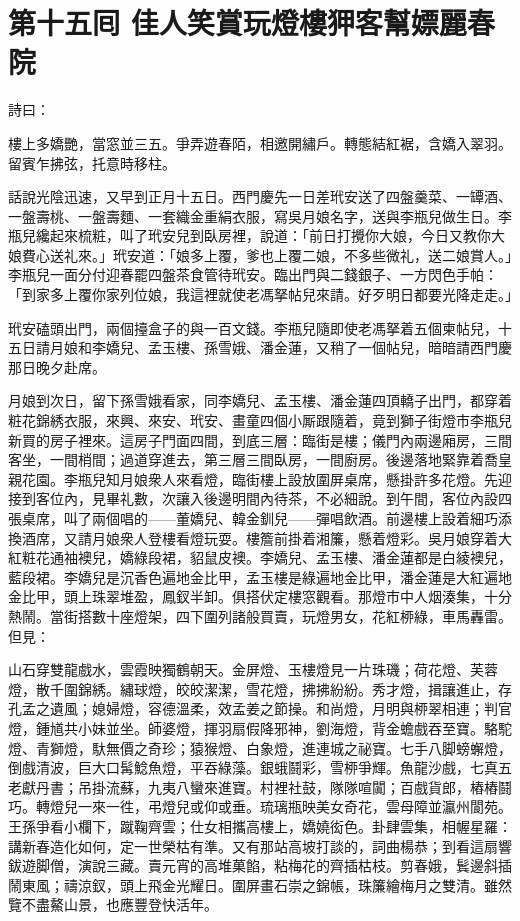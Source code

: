 
\chapter*{第十五囘 佳人笑賞玩燈樓狎客幫嫖麗春院}


詩曰：

樓上多嬌艷，當窓並三五。爭弄遊春陌，相邀開繡戶。轉態結紅裾，含嬌入翠羽。留賓乍拂弦，托意時移柱。

話說光陰迅速，又早到正月十五日。西門慶先一日差玳安送了四盤羹菜、一罈酒、一盤壽桃、一盤壽麵、一套織金重絹衣服，寫吳月娘名字，送與李瓶兒做生日。李瓶兒纔起來梳粧，叫了玳安兒到臥房裡，說道：「前日打攪你大娘，今日又教你大娘費心送礼來。」玳安道：「娘多上覆，爹也上覆二娘，{}不多些微礼，送二娘賞人。」李瓶兒一面分付迎春罷四盤茶食管待玳安。臨出門與二錢銀子、一方閃色手帕：「到家多上覆你家列位娘，我這裡就使老馮拏帖兒來請。好歹明日都要光降走走。」

玳安磕頭出門，兩個擡盒子的與一百文錢。李瓶兒隨即使老馮拏着五個柬帖兒，十五日請月娘和李嬌兒、孟玉樓、孫雪娥、潘金蓮，又稍了一個帖兒，暗暗請西門慶那日晚夕赴席。

月娘到次日，留下孫雪娥看家，同李嬌兒、孟玉樓、潘金蓮四頂轎子出門，都穿着粧花錦綉衣服，來興、來安、玳安、畫童四個小厮跟隨着，竟到獅子街燈市李瓶兒新買的房子裡來。這房子門面四間，到底三層：臨街是樓；儀門內兩邊廂房，三間客坐，一間梢間；過道穿進去，第三層三間臥房，一間廚房。後邊落地緊靠着喬皇親花園。{}李瓶兒知月娘衆人來看燈，臨街樓上設放圍屏桌席，懸掛許多花燈。先迎接到客位內，見畢礼數，次讓入後邊明間內待茶，不必細說。到午間，客位內設四張桌席，叫了兩個唱的——董嬌兒、韓金釧兒——彈唱飲酒。前邊樓上設着細巧添換酒席，又請月娘衆人登樓看燈玩耍。樓簷前掛着湘簾，懸着燈彩。吳月娘穿着大紅粧花通袖襖兒，嬌綠段裙，貂鼠皮襖。李嬌兒、孟玉樓、潘金蓮都是白綾襖兒，藍段裙。李嬌兒是沉香色遍地金比甲，孟玉樓是綠遍地金比甲，潘金蓮是大紅遍地金比甲，頭上珠翠堆盈，鳳釵半卸。俱搭伏定樓窓觀看。那燈市中人烟湊集，十分熱鬧。當街搭數十座燈架，四下圍列諸般買賣，玩燈男女，花紅桺綠，車馬轟雷。但見：

山石穿雙龍戲水，雲霞映獨鶴朝天。金屏燈、玉樓燈見一片珠璣；荷花燈、芙蓉燈，散千圍錦綉。繡球燈，皎皎潔潔，雪花燈，拂拂紛紛。秀才燈，揖讓進止，存孔孟之遺風；{}媳婦燈，容德溫柔，效孟姜之節操。和尚燈，月明與桺翠相連；判官燈，鍾馗共小妹並坐。師婆燈，揮羽扇假降邪神，劉海燈，背金蟾戲吞至寶。駱駝燈、青獅燈，馱無價之奇珍；猿猴燈、白象燈，進連城之祕寶。七手八脚螃蠏燈，倒戲清波，巨大口髯鯰魚燈，平吞綠藻。銀蛾鬪彩，雪桺爭輝。魚龍沙戲，七真五老獻丹書；吊掛流蘇，九夷八蠻來進寶。村裡社鼓，隊隊喧闐；百戲貨郎，樁樁鬪巧。轉燈兒一來一徃，弔燈兒或仰或垂。琉璃瓶映美女奇花，雲母障並瀛州閬苑。王孫爭看小欄下，蹴鞠齊雲；仕女相攜高樓上，嬌嬈衒色。卦肆雲集，相幄星羅：講新春造化如何，定一世榮枯有準。又有那站高坡打談的，詞曲楊恭；到看這扇響鈸遊脚僧，演說三藏。賣元宵的高堆菓餡，粘梅花的齊插枯枝。剪春娥，鬂邊斜插鬧東風；禱涼釵，頭上飛金光耀日。圍屏畫石崇之錦帳，珠簾繪梅月之雙清。雖然覽不盡鰲山景，也應豐登快活年。

